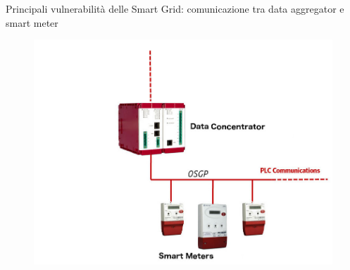 \begin{frame}{Principali vulnerabilità delle Smart Grid: comunicazione tra data aggregator e smart meter}
	\begin{figure}[h]
		\includegraphics[scale=0.3,cfbox=blue_slides 1pt 0pt]{imgs/aggregator.jpg}
	\end{figure}
\end{frame}

